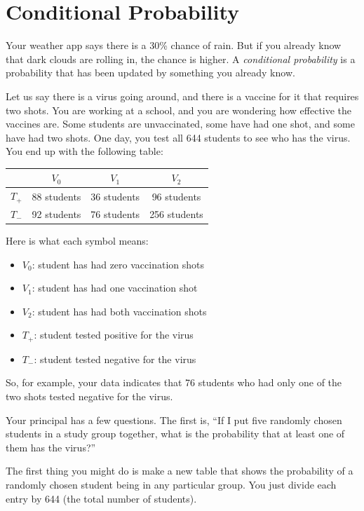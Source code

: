 \chapter{Conditional Probability}

Your weather app says there is a 30\% chance of rain. But if you
already know that dark clouds are rolling in, the chance is higher. A
\emph{conditional probability} is a probability that has been updated by
something you already know.

Let us say there is a virus going around, and there is a vaccine for it
that requires two shots. You are working at a school, and you are
wondering how effective the vaccines are. Some students are
unvaccinated, some have had one shot, and some have had two shots. One
day, you test all 644 students to see who has the virus. You end up
with the following table:
\begin{tabular}{c | c c c}
  & $V_0$ & $V_1$ & $V_2$ \\
  \hline
  $T_{+}$ & 88 students & 36 students & 96 students \\
  $T_{-}$ & 92 students & 76 students & 256 students \\
\end{tabular}

Here is what each symbol means:

\begin{itemize}
\item $V_0$: student has had zero vaccination shots
\item $V_1$: student has had one vaccination shot
\item $V_2$: student has had both vaccination shots
\item $T_{+}$: student tested positive for the virus
\item $T_{-}$: student tested negative for the virus
\end {itemize}

So, for example, your data indicates that 76 students who
had only one of the two shots tested negative for the virus.

Your principal has a few questions. The first is, ``If I put five
randomly chosen students in a study group together, what is the
probability that at least one of them has the virus?''

The first thing you might do is make a new table that shows the probability of a randomly chosen student being in any particular
group. You just divide each entry by 644 (the total number of
students).

